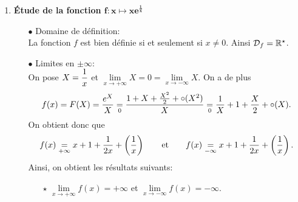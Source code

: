 \documentclass[a4paper, 11pt,reqno]{article}
\begin{document}
\begin{correction}
\begin{enumerate}
\begin{itemize}
\begin{itemize}
				                  Comme, par croissance compar\'ee, on a: $\lim\limits_{x\to 0^+} xe^{\frac{1}{x}}=\lim\limits_{X\to +\infty} \ddp\frac{e^X}{X}=+\infty$, on a:
				                  $$\lim\limits_{x\to 0^+} \ddp\frac{f(x)-f(0)}{x}=0.$$
				                  Ainsi, la fonction $f$ est d\'erivable \`a droite en 0 avec $f^{\prime}_d(0)=0$.
				            \item[$\star$] \'Etude de la d\'erivabilit\'e en $0^-$:\\
				                  \noindent On \'etudie le taux d'accroissement quand $x$ tend vers $0^-$::
				                  $$\ddp\frac{f(x)-f(0)}{x}=\ddp\frac{2e^{\frac{1}{x}}}{x(e^{\frac{1}{x}} -1 )}=\ddp\frac{2}{e^{\frac{1}{x}}-1 }\times \ddp\frac{e^{\frac{1}{x}}}{x}.$$
				                  Comme, par croissance compar\'ee, on a: $\lim\limits_{x\to 0^-} \ddp\frac{e^{\frac{1}{x}}}{x}=\lim\limits_{X\to -\infty} Xe^X=0$, on a:
				                  $$\lim\limits_{x\to 0^-} \ddp\frac{f(x)-f(0)}{x}=0.$$
				                  Ainsi, la fonction $f$ est d\'erivable \`a gauche en 0 avec $f^{\prime}_g(0)=0$.
			            \end{itemize}
		      \end{itemize}
		\item \textbf{\'Etude de la fonction $\mathbf{f: x\mapsto xe^{\frac{1}{x}}}$}
		      \begin{itemize}
			      \item[$\bullet$] Domaine de d\'efinition:\\
			            \noindent La fonction $f$ est bien d\'efinie si et seulement si $x\not= 0$. Ainsi $\mathcal{D}_f=\mathbb{R}^{\star}$.
			      \item[$\bullet$] Limites en $\pm\infty$:\\
			            \noindent On pose $X=\displaystyle\frac{1}{x}$ et $\lim\limits_{x\to +\infty} X=0=\lim\limits_{x\to -\infty} X$. On a de plus
			            $$f(x)=F(X)=\displaystyle\frac{e^X}{X}\underset{0}{=}\displaystyle\frac{1+X+\frac{X^2}{2}+\circ(X^2)}{X}
				            \underset{0}{=} \displaystyle\frac{1}{X}+1+\displaystyle\frac{X}{2}+\circ(X).$$
			            On obtient donc que
			            $$f(x)\underset{+\infty}{=} x+1+\displaystyle\frac{1}{2x}+\left(\displaystyle\frac{1}{x} \right)\qquad \hbox{et}\qquad
				            f(x)\underset{-\infty}{=} x+1+\displaystyle\frac{1}{2x}+\left(\displaystyle\frac{1}{x} \right).$$
			            Ainsi, on obtient les r\'esultats suivants:
			            \begin{itemize}
				            \item[$\star$] $\lim\limits_{x\to +\infty} f(x)=+\infty$ et $\lim\limits_{x\to -\infty} f(x)=-\infty$.

\end{itemize}
\end{itemize}
\end{enumerate}
\end{correction}
\end{document}
